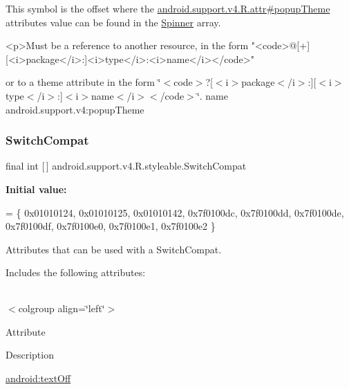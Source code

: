 This symbol is the offset where the \hyperlink{classandroid_1_1support_1_1v4_1_1R_1_1attr_a05446418402decb6877749b6de8bc2d8}{android.\+support.\+v4.\+R.\+attr\#popup\+Theme} attribute\textquotesingle{}s value can be found in the \hyperlink{classandroid_1_1support_1_1v4_1_1R_1_1styleable_a34e1edd521133711195b551c5477c69d}{Spinner} array.

\begin{DoxyVerb}      <p>Must be a reference to another resource, in the form "<code>@[+][<i>package</i>:]<i>type</i>:<i>name</i></code>"
\end{DoxyVerb}
 or to a theme attribute in the form \char`\"{}$<$code$>$?\mbox{[}$<$i$>$package$<$/i$>$\+:\mbox{]}\mbox{[}$<$i$>$type$<$/i$>$\+:\mbox{]}$<$i$>$name$<$/i$>$$<$/code$>$\char`\"{}.  name android.\+support.\+v4\+:popup\+Theme \mbox{\label{classandroid_1_1support_1_1v4_1_1R_1_1styleable_a3b46a9ea84acdcc1d9e88a54fc6f685e}} 
\subsubsection{\texorpdfstring{Switch\+Compat}{SwitchCompat}}
{\footnotesize\ttfamily final int \mbox{[}$\,$\mbox{]} android.\+support.\+v4.\+R.\+styleable.\+Switch\+Compat\hspace{0.3cm}{\ttfamily [static]}}

{\bfseries Initial value\+:}
\begin{DoxyCode}
= \{
            0x01010124, 0x01010125, 0x01010142, 0x7f0100dc,
            0x7f0100dd, 0x7f0100de, 0x7f0100df, 0x7f0100e0,
            0x7f0100e1, 0x7f0100e2
        \}
\end{DoxyCode}
Attributes that can be used with a Switch\+Compat. 

Includes the following attributes\+:

\tabulinesep=1mm
\begin{longtabu} spread 0pt [c]{*{0}{|X[-1]}|}
\hline
\end{longtabu}
$<$colgroup align=\char`\"{}left\char`\"{}$>$ 

Attribute

Description 

{\ttfamily \hyperlink{classandroid_1_1support_1_1v4_1_1R_1_1styleable_ab9ffea56b6dc29ec8c9df5f7f58bcdf4}{android\+:text\+Off}}

